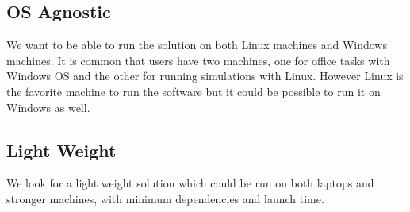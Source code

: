 \subsection{OS Agnostic}
We want to be able to run the solution on both Linux machines and Windows machines. It is common that users have
two machines, one for office tasks with Windows OS and the other for running simulations with Linux. However Linux
is the favorite machine to run the software but it could be possible to run it on Windows as well.

\subsection{Light Weight}
We look for a light weight solution which could be run on both laptops and stronger machines, with minimum dependencies
and launch time.

